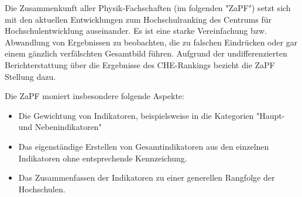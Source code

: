 Die Zusammenkunft aller Physik-Fachschaften (im folgenden "ZaPF") setzt sich mit den aktuellen Entwicklungen zum Hochschulranking des Centrums für Hochschulentwicklung auseinander. 
Es ist eine starke Vereinfachung  bzw. Abwandlung von Ergebnissen zu beobachten, die zu falschen Eindrücken oder gar einem gänzlich verfälschten Gesamtbild führen. Aufgrund der undifferenzierten Berichterstattung über die Ergebnisse des CHE-Rankings bezieht die ZaPF Stellung dazu.
 
Die ZaPF moniert insbesondere folgende Aspekte:
\begin{itemize}
\item Die Gewichtung von Indikatoren, beispielsweise in die Kategorien "Haupt- und Nebenindikatoren"
\item Das eigenständige Erstellen von Gesamtindikatoren aus den einzelnen Indikatoren ohne entsprechende Kennzeichung.
\item Das Zusammenfassen der Indikatoren zu einer generellen Rangfolge der Hochschulen.
\end{itemize}

